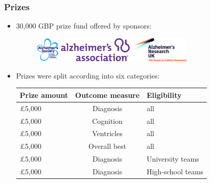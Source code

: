 \documentclass[8pt,xcolor=table,aspectratio=169]{beamer}
\begin{document}
\begin{frame}
\frametitle{Prizes}

\begin{itemize}
 \item 30,000 GBP prize fund offered by sponsors:

\begin{figure}
\centering
 \includegraphics[height=1.2cm]{alzsoc_logo}
 \includegraphics[height=1.2cm]{alzassoc_logo}
 \includegraphics[height=1.2cm]{alzresuk_logo}
\end{figure}

\vfill

 \item Prizes were split according into six categories:

\begin{table}
\centering
 \begin{tabular}{>{\centering\arraybackslash}m{1.5cm}  c  >{\centering\arraybackslash}m{2cm}}
\textbf{Prize amount} & \textbf{Outcome measure} & \textbf{Eligibility} \\
\hline
£5,000 & Diagnosis & all \\
£5,000 & Cognition & all\\
£5,000 & Ventricles & all\\
£5,000 & Overall best & all\\
£5,000 & Diagnosis & University teams\\
£5,000 & Diagnosis & High-school teams\\
\end{tabular}
\end{table}

\end{itemize}


\end{frame}

\end{document}
